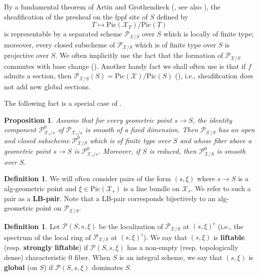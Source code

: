 \documentclass[letter, 11pt]{article}
\theoremstyle{plain}
\newtheorem{proposition}[subsubsection]{Proposition}
\theoremstyle{definition}
\newtheorem{definition}[subsubsection]{Definition}
\newcommand{\IZ}{\mathbb{Z}}
\newcommand{\<}{\langle}
\renewcommand{\>}{\rangle}
\newcommand{\sX}{\mathcal{X}}
\newcommand{\shPic}{\mathscr{P}}
\newcommand{\Pic}{\mathrm{Pic}}
\newcommand{\shP}{\mathscr{P}}
\begin{document}
By a fundamental theorem of Artin and Grothendieck (\cite[\S8.4~Thm~3]{BLR}, see also \cite[Thm~9.4.8]{Kleiman}), the sheafification of the presheaf on the fppf site of $S$ defined by 
$$ T \mapsto \Pic(\sX_T)/\Pic(T) $$
is representable by a separated scheme $\shP_{\sX/S}$ over $S$ which is locally of finite type; moreover, every closed subscheme of $\shP_{\sX/S}$ which is of finite type over $S$ is projective over $S$. We often implicitly use the fact that the formation of $\shP_{\sX/S}$ commutes with base change (\cite[Ex.~9.4.4]{Kleiman}). Another handy fact we shall often use is that if $f$ admits a section, then $\shPic_{\sX/S}(S) = \Pic(\sX)/ \Pic(S)$ (\cite[\S8.1~Prop.~4]{BLR}), i.e., sheafification does not add new global sections.

The following fact is a special case of \cite[Prop.~9.5.20]{Kleiman}. 
\begin{proposition}
\label{prop: Kleiman}
    Assume that for every geometric point $s \to S$, the identity component $\shP^0_{\sX_s/s}$ of $\shP_{\sX_s/s}$ is smooth of a fixed dimension. Then $\shP_{\sX/S}$ has an open and closed subscheme $\shP^0_{\sX/S}$ which is of finite type over $S$ and whose fiber above a geometric point $s \to S$ is $\shP^0_{\sX_s/s}$. Moreover, if $S$ is reduced, then $\shP^0_{\sX/S}$ is smooth over $S$. 
\end{proposition} 

\begin{definition}
    We will often consider pairs of the form $(s, \xi)$ where $s \to S$ is a alg-geometric point and $\xi \in \Pic(\sX_s)$ is a line bundle on $\sX_s$. We refer to such a pair as a \textbf{LB-pair}. Note that a LB-pair corresponds bijectively to an alg-geometric point on $\shP_{\sX/S}$.
\end{definition} 



\begin{definition}
\label{def: localizations}
    Let $\shP(S,s,\xi)$ be the localization of $\shP_{\sX/S}$ at $(s, \xi)^\flat$ (i.e., the spectrum of the local ring of $\shP_{\sX/S}$ at $(s, \xi)^\flat$). We say that $(s, \xi)$ is \textbf{liftable} (resp. \textbf{strongly liftable}) if $\shP(S, s, \xi)$ has a non-empty (resp. topologically dense) characteristic $0$ fiber. When $S$ is an integral scheme, we say that $(s, \xi)$ is \textbf{global} (on $S$) if $\shP(S, s, \xi)$ dominates $S$. 
\end{definition}
\end{document}
